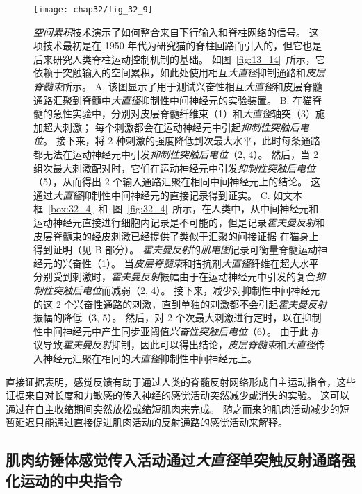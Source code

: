 \begin{figure}[htbp]
	\centering
	\texttt{[image: chap32/fig\_32\_9]}
	\caption{\textit{空间累积}技术演示了如何整合来自下行输入和脊柱网络的信号。
	这项技术最初是在 1950 年代为研究猫的脊柱回路而引入的，但它也是后来研究人类脊柱运动控制机制的基础。
	如图~\ref{fig:13_14}~所示，它依赖于突触输入的空间累积，如此处使用相互\textit{大直径}抑制通路和\textit{皮层脊髓束}所示。
	A. 该图显示了用于测试兴奋性相互\textit{大直径}和皮层脊髓通路汇聚到脊髓中\textit{大直径}抑制性中间神经元的实验装置。
	B. 在猫脊髓的急性实验中，分别对皮层脊髓纤维束（1）和\textit{大直径}轴突（3）施加超大刺激；
	每个刺激都会在运动神经元中引起\textit{抑制性突触后电位}。
	接下来，将 2 种刺激的强度降低到次最大水平，此时每条通路都无法在运动神经元中引发\textit{抑制性突触后电位}（2, 4）。
	然后，当 2 组次最大刺激配对时，它们在运动神经元中引发\textit{抑制性突触后电位}（5），从而得出 2 个输入通路汇聚在相同中间神经元上的结论。
	这通过\textit{大直径}抑制性中间神经元的直接记录得到证实。
	C. 如文本框~\ref{box:32_4}~和~图~\ref{fig:32_4}~所示，在人类中，从中间神经元和运动神经元直接进行细胞内记录是不可能的，但是记录\textit{霍夫曼反射}和皮层脊髓束的经皮刺激已经提供了类似于汇聚的间接证据 在猫身上得到证明（见 B 部分）。
	\textit{霍夫曼反射}的\textit{肌电图}记录可衡量脊髓运动神经元的兴奋性（1）。
	当\textit{皮层脊髓束}和拮抗剂\textit{大直径}纤维在超大水平分别受到刺激时，\textit{霍夫曼反射}振幅由于在运动神经元中引发的复合\textit{抑制性突触后电位}而减弱（2, 4）。
	接下来，减少对抑制性中间神经元的这 2 个兴奋性通路的刺激，直到单独的刺激都不会引起\textit{霍夫曼反射}振幅的降低（3, 5）。
	然后，对 2 个次最大刺激进行定时，以在抑制性中间神经元中产生同步亚阈值\textit{兴奋性突触后电位}（6）。
	由于此协议导致\textit{霍夫曼反射}抑制，因此可以得出结论，\textit{皮层脊髓束}和\textit{大直径}传入神经元汇聚在相同的\textit{大直径}抑制性中间神经元上。}
	\label{fig:32_9}
\end{figure}


直接证据表明，感觉反馈有助于通过人类的脊髓反射网络形成自主运动指令，这些证据来自对长度和力敏感的传入神经的感觉活动突然减少或消失的实验。
这可以通过在自主收缩期间突然放松或缩短肌肉来完成。
随之而来的肌肉活动减少的短暂延迟只能通过直接促进肌肉活动的反射通路的感觉活动来解释。



\subsection{肌肉纺锤体感觉传入活动通过\textit{大直径}单突触反射通路强化运动的中央指令}


